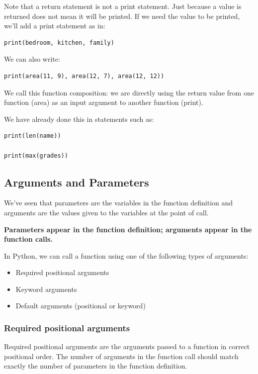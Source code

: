 \documentclass{article}
\begin{document}
Note that a return statement is not a print statement.  Just because a value is returned does not mean it will be printed.  If we need the value to be printed, we'll add a print statement as in:

\begin{lstlisting}
print(bedroom, kitchen, family)
\end{lstlisting}

We can also write:

\begin{lstlisting}
print(area(11, 9), area(12, 7), area(12, 12)) 
\end{lstlisting}

We call this function composition:  we are directly using the return value from one function (area) as an input argument to another function (print).

We have already done this in statements such as:

\begin{lstlisting}
print(len(name))

print(max(grades))
\end{lstlisting}

\subsection{Arguments and Parameters}

We've seen that parameters are the variables in the function definition and arguments are the values given to the variables at the point of call.

\textbf{Parameters appear in the function definition; arguments appear in the function calls.}

In Python, we can call a function using one of the following types of arguments:

\begin{itemize}
\item Required positional arguments
\item Keyword arguments
\item Default arguments (positional or keyword)
\end{itemize}

\subsubsection{Required positional arguments}
Required positional arguments are the arguments passed to a function in correct positional order. The number of arguments in the function call should match exactly the number of parameters in the function definition.  
\end{document}

